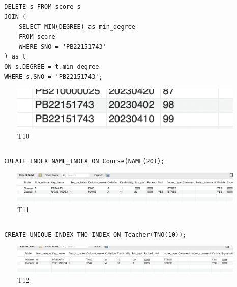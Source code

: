 \documentclass[UTF8]{ctexart}
\begin{document}
\subsection{}
\begin{lstlisting}
  DELETE s FROM score s
  JOIN (
      SELECT MIN(DEGREE) as min_degree
      FROM score
      WHERE SNO = 'PB22151743'
  ) as t
  ON s.DEGREE = t.min_degree
  WHERE s.SNO = 'PB22151743';
\end{lstlisting}
\begin{figure}[H]
  \centering
  \includegraphics[scale=0.7]{pics/10.png}
  \caption*{T10}
\end{figure}

\subsection{}
\begin{lstlisting}
  CREATE INDEX NAME_INDEX ON Course(NAME(20));
\end{lstlisting}
\begin{figure}[H]
  \centering
  \includegraphics[scale=0.4]{pics/11.png}
  \caption*{T11}
\end{figure}

\subsection{}
\begin{lstlisting}
  CREATE UNIQUE INDEX TNO_INDEX ON Teacher(TNO(10));
\end{lstlisting}
\begin{figure}[H]
  \centering
  \includegraphics[scale=0.4]{pics/12.png}
  \caption*{T12}
\end{figure}
\end{document}
